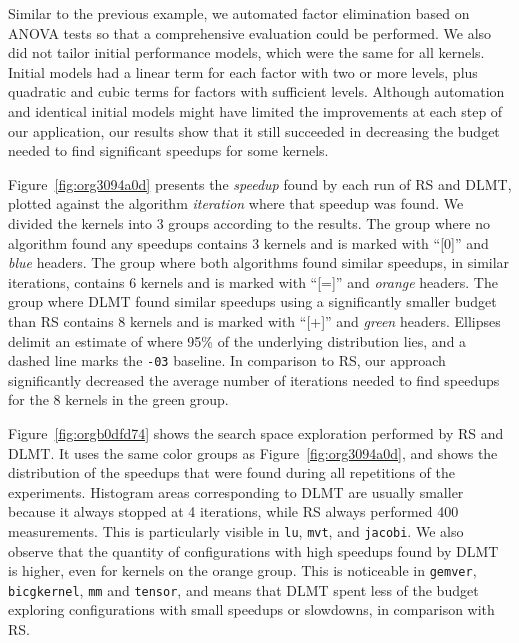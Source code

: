 \documentclass[conference]{IEEEtran}
\begin{document}
Similar to the previous example, we  automated factor elimination based on ANOVA
tests so  that a comprehensive  evaluation could be  performed. We also  did not
tailor initial performance models, which were  the same for all kernels. Initial
models had a linear term for each factor with two or more levels, plus quadratic
and  cubic terms  for factors  with sufficient  levels. Although  automation and
identical initial models might have limited the improvements at each step of our
application, our results  show that it still succeeded in  decreasing the budget
needed to find significant speedups for some kernels.

Figure~\ref{fig:org3094a0d} presents  the \emph{speedup} found by  each run of
RS and  DLMT, plotted  against the  algorithm \emph{iteration}  where that  speedup was
found. We divided the kernels into 3  groups according to the results. The group
where no  algorithm found  any speedups  contains 3 kernels  and is  marked with
``[0]''  and  \emph{blue}  headers.  The  group where  both  algorithms  found  similar
speedups, in similar  iterations, contains 6 kernels and is  marked with ``[=]''
and  \emph{orange}  headers. The  group  where  DLMT  found  similar speedups  using  a
significantly  smaller budget  than RS  contains 8  kernels and  is marked  with
``[+]'' and  \emph{green} headers.  Ellipses delimit  an estimate of  where 95\%  of the
underlying distribution lies, and a dashed line marks the \texttt{-03} baseline.
In comparison to RS, our approach  significantly decreased the average number of
iterations needed to find speedups for the 8 kernels in the green group.

Figure~\ref{fig:orgb0dfd74} shows  the search space exploration  performed by RS
and DLMT. It uses the same color groups as Figure~\ref{fig:org3094a0d},
and  shows  the  distribution  of  the  speedups  that  were  found  during  all
repetitions  of  the experiments.  Histogram  areas  corresponding to  DLMT  are
usually  smaller because  it always  stopped at  4 iterations,  while RS  always
performed  400  measurements. This  is  particularly  visible  in \texttt{lu},  \texttt{mvt},  and
\texttt{jacobi}. We also  observe that the quantity of configurations  with high speedups
found  by  DLMT is  higher,  even  for kernels  on  the  orange group.  This  is
noticeable in \texttt{gemver}, \texttt{bicgkernel}, \texttt{mm} and  \texttt{tensor}, and means that DLMT spent less
of  the budget  exploring configurations  with small  speedups or  slowdowns, in
comparison with RS.
\end{document}
